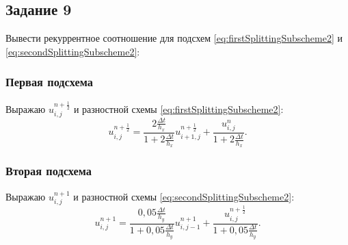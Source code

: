 \documentclass[12pt, a4paper]{report}
\begin{document}
	\subsection*{Задание 9}
	\large
	Вывести рекуррентное соотношение для подсхем \eqref{eq:firstSplittingSubscheme2} и \eqref{eq:secondSplittingSubscheme2}: \par
	\subsubsection*{Первая подсхема}
	\large
	Выражаю $u_{i, j}^{n+\frac{1}{2}}$ и разностной схемы \eqref{eq:firstSplittingSubscheme2}:
	\begin{equation*}
		u_{i, j}^{n+\frac{1}{2}} = \frac{2\frac{\Delta t}{h_{x}}}{1 + 2\frac{\Delta t}{h_{x}}}u_{i+1, j}^{n+\frac{1}{2}} + \frac{u_{i, j}^{n}}{1 + 2\frac{\Delta t}{h_{x}}}.
	\end{equation*}
	\subsubsection*{Вторая подсхема}
	\large
	Выражаю $u_{i, j}^{n+1}$ и разностной схемы \eqref{eq:secondSplittingSubscheme2}:
	\begin{equation*}
		u_{i, j}^{n+1} = \frac{0,05\frac{\Delta t}{h_{y}}}{1 + 0,05\frac{\Delta t}{h_{y}}}u_{i, j-1}^{n+1} + \frac{u_{i, j}^{n+\frac{1}{2}}}{1 + 0,05\frac{\Delta t}{h_{y}}}.
	\end{equation*}
\end{document}
